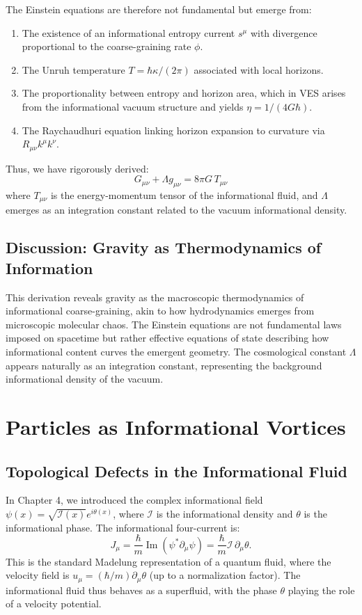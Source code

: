 \documentclass[12pt,a4paper]{book}
\newcommand{\I}{\mathcal{I}}
\begin{document}
The Einstein equations are therefore not fundamental but emerge from:
\begin{enumerate}
    \item The existence of an informational entropy current $s^\mu$ with divergence proportional to the coarse-graining rate $\phi$.
    \item The Unruh temperature $T = \hbar \kappa/(2\pi)$ associated with local horizons.
    \item The proportionality between entropy and horizon area, which in VES arises from the informational vacuum structure and yields $\eta = 1/(4G\hbar)$.
    \item The Raychaudhuri equation linking horizon expansion to curvature via $R_{\mu\nu} k^\mu k^\nu$.
\end{enumerate}
Thus, we have rigorously derived:
\begin{equation}
    \boxed{G_{\mu\nu} + \Lambda g_{\mu\nu} = 8\pi G \, T_{\mu\nu}}
\end{equation}
where $T_{\mu\nu}$ is the energy-momentum tensor of the informational fluid, and $\Lambda$ emerges as an integration constant related to the vacuum informational density.

\section{Discussion: Gravity as Thermodynamics of Information}

This derivation reveals gravity as the macroscopic thermodynamics of informational coarse-graining, akin to how hydrodynamics emerges from microscopic molecular chaos. The Einstein equations are not fundamental laws imposed on spacetime but rather effective equations of state describing how informational content curves the emergent geometry. The cosmological constant $\Lambda$ appears naturally as an integration constant, representing the background informational density of the vacuum.

\chapter{Particles as Informational Vortices}

\section{Topological Defects in the Informational Fluid}

In Chapter 4, we introduced the complex informational field $\psi(x) = \sqrt{\I(x)} e^{i\theta(x)}$, where $\I$ is the informational density and $\theta$ is the informational phase. The informational four-current is:
\begin{equation}
    J_\mu = \frac{\hbar}{m} \operatorname{Im}(\psi^* \partial_\mu \psi) = \frac{\hbar}{m} \I \, \partial_\mu \theta.
\end{equation}
This is the standard Madelung representation of a quantum fluid, where the velocity field is $u_\mu = (\hbar/m) \partial_\mu \theta$ (up to a normalization factor). The informational fluid thus behaves as a superfluid, with the phase $\theta$ playing the role of a velocity potential.
\end{document}
